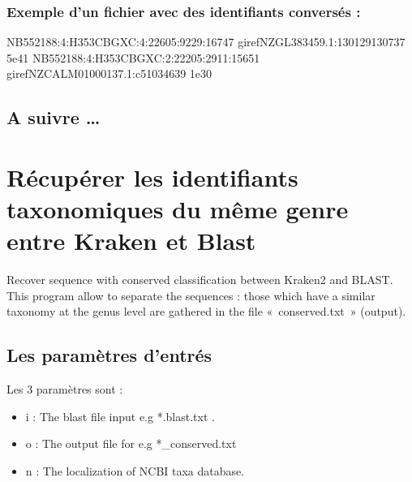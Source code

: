 \documentclass[letterpaper,10pt,french]{sphinxmanual}
\begin{document}
\subsubsection{Exemple d’un fichier avec des identifiants conversés :}
\label{\detokenize{bash/find_same_id_kraken_blast_bacteria.sh:exemple-d-un-fichier-avec-des-identifiants-converses}}
\begin{sphinxVerbatim}[commandchars=\\\{\}]
NB552188:4:H353CBGXC:4:22605:9229:16747 girefNZ\PYGZus{}GL383459.1:130129\PYGZhy{}130737             5e\PYGZhy{}41                   
NB552188:4:H353CBGXC:2:22205:2911:15651 girefNZ\PYGZus{}CALM01000137.1:c5103\PYGZhy{}4639               1e\PYGZhy{}30                 
\end{sphinxVerbatim}


\subsection{A suivre …}
\label{\detokenize{bash/find_same_id_kraken_blast_bacteria.sh:a-suivre}}

\section{Récupérer les identifiants taxonomiques du même genre entre Kraken et Blast}
\label{\detokenize{python/sort_blasted_seq.py:recuperer-les-identifiants-taxonomiques-du-meme-genre-entre-kraken-et-blast}}\label{\detokenize{python/sort_blasted_seq.py::doc}}
Recover sequence with conserved classification between Kraken2 and BLAST. This program allow to separate the sequences : those which have a similar taxonomy at the genus level are gathered in the file « conserved.txt » (output).


\subsection{Les paramètres d’entrés}
\label{\detokenize{python/sort_blasted_seq.py:les-parametres-d-entres}}
Les 3 paramètres sont :
\begin{itemize}
\item {} 
\sphinxhyphen{}i : The blast file input e.g *.blast.txt .

\item {} 
\sphinxhyphen{}o : The output file for e.g *\_conserved.txt

\item {} 
\sphinxhyphen{}n : The localization of NCBI taxa database.

\end{itemize}
\end{document}
